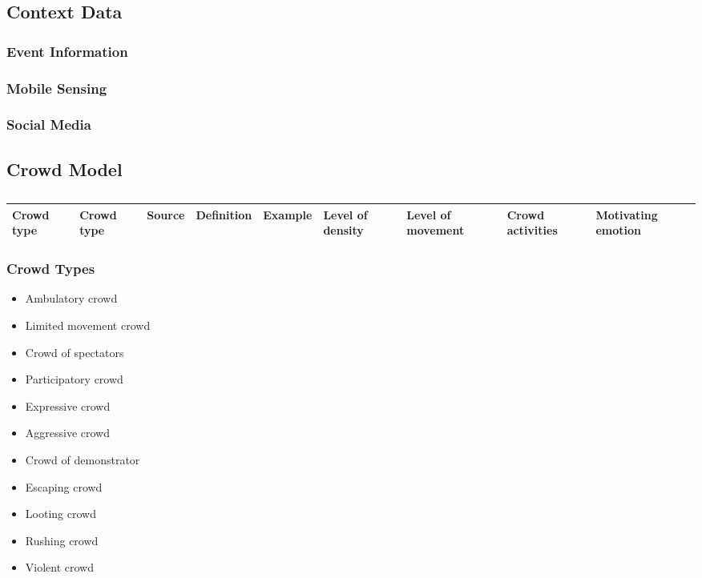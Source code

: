 \subsection{Context Data}

\subsubsection{Event Information}

\subsubsection{Mobile Sensing}

\subsubsection{Social Media}

\subsection{Crowd Model}

\begin{center}
	\begin{longtable}{|p{2cm}|p{2cm}|p{2cm}|p{2cm}|p{2cm}|p{2cm}|p{2cm}|p{2cm}|p{2cm}|}
	\caption{}
	\label{} \\
	\hline
	\textbf{Crowd type} & \textbf{Crowd type} & \textbf{Source} & \textbf{Definition} & \textbf{Example} & \textbf{Level of density} & \textbf{Level of movement} & \textbf{Crowd activities} & \textbf{Motivating emotion} \\
	\hline
	\end{longtable}
\end{center}

\subsubsection{Crowd Types}

\begin{itemize}
	\item Ambulatory crowd
	\item Limited movement crowd
	\item Crowd of spectators
	\item Participatory crowd
	\item Expressive crowd
	\item Aggressive crowd
	\item Crowd of demonstrator
	\item Escaping crowd
	\item Looting crowd
	\item Rushing crowd
	\item Violent crowd
\end{itemize}

